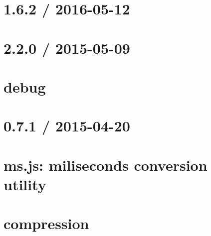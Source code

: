 \documentclass[twoside]{book}
\newcommand{\+}{\discretionary{\mbox{\scriptsize$\hookleftarrow$}}{}{}}
\begin{document}
\chapter{1.6.2 / 2016-\/05-\/12}
\label{md__c_1_workspace_demo_src_main_script_node_modules_compression__h_i_s_t_o_r_y}

\chapter{2.2.0 / 2015-\/05-\/09}
\label{md__c_1_workspace_demo_src_main_script_node_modules_compression_node_modules_debug__history}

\chapter{debug}
\label{md__c_1_workspace_demo_src_main_script_node_modules_compression_node_modules_debug__readme}

\chapter{0.7.1 / 2015-\/04-\/20}
\label{md__c_1_workspace_demo_src_main_script_node_modules_compression_node_modules_ms__history}

\chapter{ms.\+js\+: miliseconds conversion utility}
\label{md__c_1_workspace_demo_src_main_script_node_modules_compression_node_modules_ms__r_e_a_d_m_e}

\chapter{compression}
\label{md__c_1_workspace_demo_src_main_script_node_modules_compression__r_e_a_d_m_e}

\end{document}
